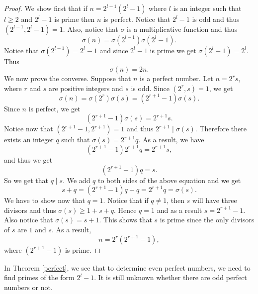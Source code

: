 \documentclass[12pt,letterpaper]{book}
\begin{document}
\begin{proof}
We show first that if $n=2^{l-1}(2^l-1)$ where $l$ is an integer
such that $l\geq 2$ and $2^l-1$ is prime then $n$ is perfect. Notice
that $2^l-1$ is odd and thus $(2^{l-1},2^l-1)=1$.  Also, notice that
$\sigma$ is a multiplicative function and thus
\begin{equation*}
\sigma(n)=\sigma(2^{l-1})\sigma(2^l-1).
\end{equation*}
Notice that $\sigma(2^{l-1})=2^l-1$ and since $ 2^l-1$ is prime we
get $\sigma(2^l-1)=2^l$.  Thus
\begin{equation*}
\sigma(n)=2n.
\end{equation*}
We now prove the converse.  Suppose that $n$ is a perfect number.
Let $n=2^rs$, where $r$ and $s$ are positive integers and $s$ is
odd. Since $(2^r,s)=1$, we get
\begin{equation*}
\sigma(n)=\sigma(2^r)\sigma(s)=(2^{r+1}-1)\sigma(s).
\end{equation*}
Since $n$ is perfect, we get
\begin{equation*}
(2^{r+1}-1)\sigma(s)=2^{r+1}s.
\end{equation*}
Notice now that $(2^{r+1}-1, 2^{r+1})=1$ and thus $2^{r+1}\mid
\sigma(s)$. Therefore there exists an integer $q$ such that
$\sigma(s)=2^{r+1}q$.  As a result, we have
\begin{equation*}
(2^{r+1}-1)2^{r+1}q=2^{r+1}s,
\end{equation*}
and thus we get
\begin{equation*}
(2^{r+1}-1)q=s.
\end{equation*}
So we get that $q\mid s$.  We add $q$ to both sides of the above
equation and we get
\begin{equation*}
s+q=(2^{r+1}-1)q+q=2^{r+1}q=\sigma(s).
\end{equation*}
We have to show now that $q=1$.  Notice that if $q\neq 1$, then $s$
will have three divisors and thus $\sigma(s)\geq 1+s+q$. Hence $q=1$
and as a result $s=2^{r+1}-1$.  Also notice that $\sigma(s)=s+1$.
This shows that $s$ is prime since the only divisors of $s$ are $1$
and $s$.  As a result,
\begin{equation*}
n=2^r(2^{r+1}-1),
\end{equation*}
where $(2^{r+1}-1)$ is prime.
\end{proof}

In Theorem \ref{perfect}, we see that to determine even perfect numbers, we
need to find primes of the form $2^l-1$.  It is still unknown
whether there are odd perfect numbers or not.
\end{document}
